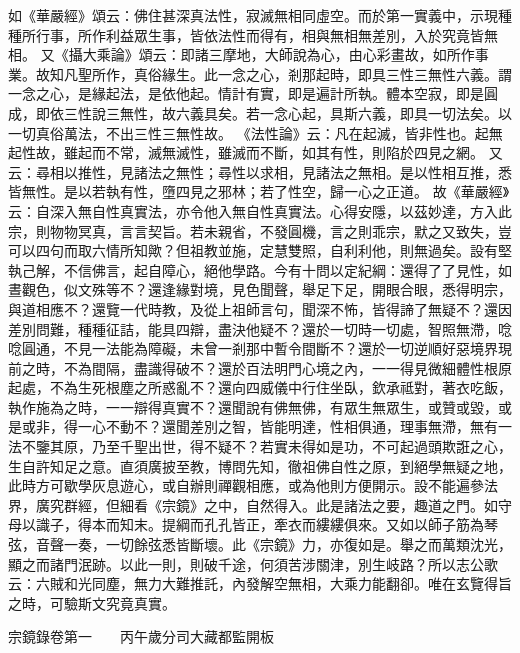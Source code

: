 如《華嚴經》頌云：{\kaishu 佛住甚深真法性，寂滅無相同虛空。}而於第一實義中，示現種種所行事，所作利益眾生事，皆依法性而得有，相與無相無差別，入於究竟皆無相。
又《攝大乘論》頌云：{\kaishu 即諸三摩地，大師說為心，由心彩畫故，如所作事業。}故知凡聖所作，真俗緣生。此一念之心，剎那起時，即具三性三無性六義。謂一念之心，是緣起法，是依他起。情計有實，即是遍計所執。體本空寂，即是圓成，即依三性說三無性，故六義具矣。若一念心起，具斯六義，即具一切法矣。以一切真俗萬法，不出三性三無性故。
《法性論》云：{\kaishu 凡在起滅，皆非性也。}起無起性故，雖起而不常，滅無滅性，雖滅而不斷，如其有性，則陷於四見之網。
又云：{\kaishu 尋相以推性，見諸法之無性；尋性以求相，見諸法之無相。}是以性相互推，悉皆無性。是以若執有性，墮四見之邪林；若了性空，歸一心之正道。
故《華嚴經》云：{\kaishu 自深入無自性真實法，亦令他入無自性真實法。}心得安隱，以茲妙達，方入此宗，則物物冥真，言言契旨。若未親省，不發圓機，言之則乖宗，默之又致失，豈可以四句而取六情所知歟？但祖教並施，定慧雙照，自利利他，則無過矣。設有堅執己解，不信佛言，起自障心，絕他學路。今有十問以定紀綱：還得了了見性，如晝觀色，似文殊等不？還逢緣對境，見色聞聲，舉足下足，開眼合眼，悉得明宗，與道相應不？還覽一代時教，及從上祖師言句，聞深不怖，皆得諦了無疑不？還因差別問難，種種征詰，能具四辯，盡決他疑不？還於一切時一切處，智照無滯，唸唸圓通，不見一法能為障礙，未曾一剎那中暫令間斷不？還於一切逆順好惡境界現前之時，不為間隔，盡識得破不？還於百法明門心境之內，一一得見微細體性根原起處，不為生死根塵之所惑亂不？還向四威儀中行住坐臥，欽承祗對，著衣吃飯，執作施為之時，一一辯得真實不？還聞說有佛無佛，有眾生無眾生，或贊或毀，或是或非，得一心不動不？還聞差別之智，皆能明達，性相俱通，理事無滯，無有一法不鑒其原，乃至千聖出世，得不疑不？若實未得如是功，不可起過頭欺誑之心，生自許知足之意。直須廣披至教，博問先知，徹祖佛自性之原，到絕學無疑之地，此時方可歇學灰息遊心，或自辦則禪觀相應，或為他則方便開示。設不能遍參法界，廣究群經，但細看《宗鏡》之中，自然得入。此是諸法之要，趣道之門。如守母以識子，得本而知末。提綱而孔孔皆正，牽衣而縷縷俱來。又如以師子筋為琴弦，音聲一奏，一切餘弦悉皆斷壞。此《宗鏡》力，亦復如是。舉之而萬類沈光，顯之而諸門泯跡。以此一則，則破千途，何須苦涉關津，別生岐路？所以志公歌云：六賊和光同塵，無力大難推託，內發解空無相，大乘力能翻卻。唯在玄覽得旨之時，可驗斯文究竟真實。 

宗鏡錄卷第一　　丙午歲分司大藏都監開板 

